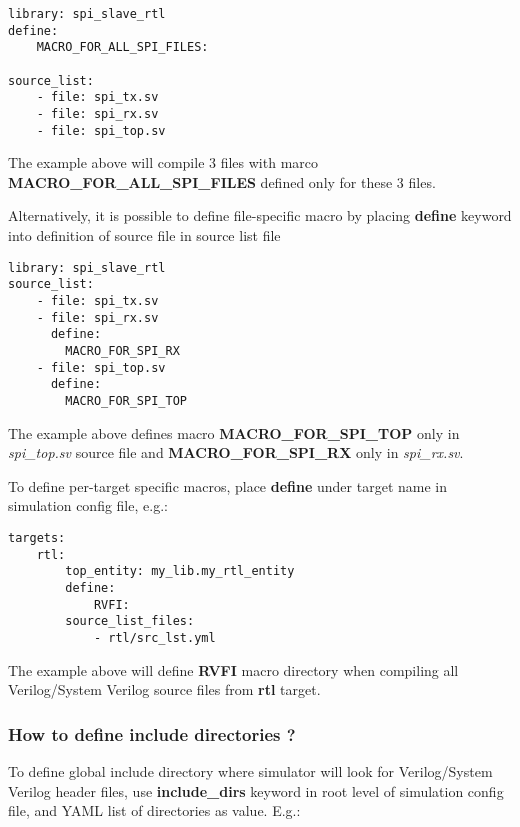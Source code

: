 \documentclass{tropic_design_spec}
\begin{document}
\begin{lstlisting}
library: spi_slave_rtl
define:
    MACRO_FOR_ALL_SPI_FILES:

source_list:
    - file: spi_tx.sv
    - file: spi_rx.sv
    - file: spi_top.sv
\end{lstlisting}

The example above will compile 3 files with marco \textbf{MACRO_FOR_ALL_SPI_FILES} defined
only for these 3 files.

Alternatively, it is possible to define file-specific macro by placing \textbf{define}
keyword into definition of source file in source list file

\begin{lstlisting}
library: spi_slave_rtl
source_list:
    - file: spi_tx.sv
    - file: spi_rx.sv
      define:
        MACRO_FOR_SPI_RX
    - file: spi_top.sv
      define:
        MACRO_FOR_SPI_TOP
\end{lstlisting}

The example above defines macro \textbf{MACRO_FOR_SPI_TOP} only in \textit{spi_top.sv}
source file and \textbf{MACRO_FOR_SPI_RX} only in \textit{spi_rx.sv}.

To define per-target specific macros, place \textbf{define} under
target name in simulation config file, e.g.:

\begin{lstlisting}
targets:
    rtl:
        top_entity: my_lib.my_rtl_entity
        define:
            RVFI:
        source_list_files:
            - rtl/src_lst.yml
\end{lstlisting}

The example above will define \textbf{RVFI} macro directory when
compiling all Verilog/System Verilog source files from \textbf{rtl} target.



\subsubsection{How to define include directories ?}
\label{sec:how-to-define-include-directories}

To define global include directory where simulator will look for Verilog/System
Verilog header files, use \textbf{include_dirs} keyword in root level of simulation config
file, and YAML list of directories as value. E.g.:
\end{document}
